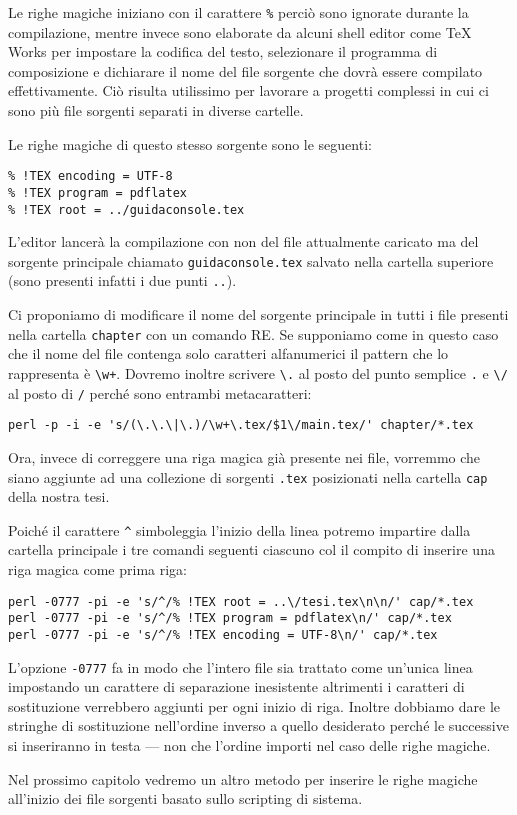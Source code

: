Le righe magiche iniziano con il carattere \texttt{\%} perciò sono ignorate
durante la compilazione, mentre invece sono elaborate da alcuni shell editor
come TeX Works per impostare la codifica del testo, selezionare il programma di
composizione e dichiarare il nome del file sorgente che dovrà essere compilato
effettivamente. Ciò risulta utilissimo per lavorare a progetti complessi in cui
ci sono più file sorgenti separati in diverse cartelle.

Le righe magiche di questo stesso sorgente sono le seguenti:
\begin{verbatim}
% !TEX encoding = UTF-8
% !TEX program = pdflatex
% !TEX root = ../guidaconsole.tex
\end{verbatim}
L'editor lancerà la compilazione con  non del file attualmente
caricato ma del sorgente principale chiamato \texttt{guidaconsole.tex} salvato
nella cartella superiore (sono presenti infatti i due punti \texttt{..}).

Ci proponiamo di modificare il nome del sorgente principale in tutti i file
presenti nella cartella \texttt{chapter} con un comando RE. Se supponiamo come
in questo caso che il nome del file contenga solo caratteri alfanumerici il
pattern che lo rappresenta è \texttt{\textbackslash w+}. Dovremo inoltre
scrivere \texttt{\textbackslash .} al posto del punto semplice \texttt{.} e
\texttt{\textbackslash /} al posto di \texttt{/} perché sono entrambi
metacaratteri:
\begin{Verbatim}[fontsize=\small]
perl -p -i -e 's/(\.\.\|\.)/\w+\.tex/$1\/main.tex/' chapter/*.tex
\end{Verbatim}

Ora, invece di correggere una riga magica già presente nei file, vorremmo che
siano aggiunte ad una collezione di sorgenti \texttt{.tex} posizionati nella
cartella \texttt{cap} della nostra tesi.

Poiché il carattere \verb=^= simboleggia l'inizio della linea potremo
impartire dalla cartella principale i tre comandi seguenti ciascuno col il
compito di inserire una riga magica come prima riga:
\begin{Verbatim}[fontsize=\small]
perl -0777 -pi -e 's/^/% !TEX root = ..\/tesi.tex\n\n/' cap/*.tex
perl -0777 -pi -e 's/^/% !TEX program = pdflatex\n/' cap/*.tex
perl -0777 -pi -e 's/^/% !TEX encoding = UTF-8\n/' cap/*.tex
\end{Verbatim}

L'opzione \texttt{-0777} fa in modo che l'intero file sia trattato come
un'unica linea impostando un carattere di separazione inesistente altrimenti i
caratteri di sostituzione verrebbero aggiunti per ogni inizio di riga. Inoltre
dobbiamo dare le stringhe di sostituzione nell'ordine inverso a quello
desiderato perché le successive si inseriranno in testa --- non che l'ordine
importi nel caso delle righe magiche.

Nel prossimo capitolo vedremo un altro metodo per inserire le righe magiche
all'inizio dei file sorgenti basato sullo scripting di sistema.

